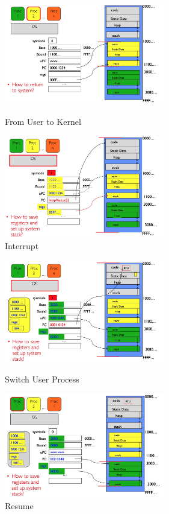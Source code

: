 \begin{figure}[http]
\centering
\begin{minipage}[t]{0.48\textwidth}
    \centering
    \includegraphics[width=7cm]{figures/from_user_to_kernel.jpg}
    \caption{From User to Kernel}
    \end{minipage}
\begin{minipage}[t]{0.48\textwidth}
    \centering
    \includegraphics[width=7cm]{figures/interupt.jpg}
    \caption{Interrupt}
    \end{minipage}
\end{figure}

\begin{figure}[http]
\centering
\begin{minipage}[t]{0.48\textwidth}
    \centering
    \includegraphics[width=7cm]{figures/switch.jpg}
    \caption{Switch User Process}
    \end{minipage}
\begin{minipage}[t]{0.48\textwidth}
    \centering
    \includegraphics[width=7cm]{figures/resume.jpg}
    \caption{Resume}
    \end{minipage}
\end{figure}
